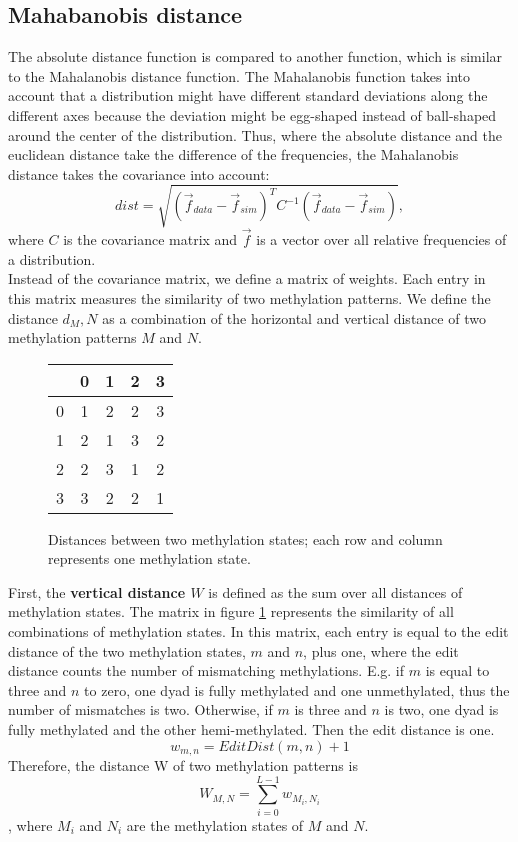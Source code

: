 \subsection{Mahabanobis distance}
\label{Mahalanobis}
The absolute distance function is compared to another function, which is similar to the Mahalanobis distance function. The Mahalanobis function takes into account that a distribution might have different standard deviations along the different axes because the deviation might be egg-shaped instead of ball-shaped around the center of the distribution. Thus, where the absolute distance and the euclidean distance take the difference of the frequencies, the Mahalanobis distance takes the covariance into account:
\[dist = \sqrt{(\vec{f}_{data}-\vec{f}_{sim})^T C^{-1} (\vec{f}_{data}-\vec{f}_{sim})},\]
where $C$ is the covariance matrix and $\vec{f}$ is a vector over all relative frequencies of a distribution.\\

Instead of the covariance matrix, we define a matrix of weights. Each entry in this matrix measures the similarity of two methylation patterns. We define the distance $d_M,N$ as a combination of the horizontal and vertical distance of two methylation patterns $M$ and $N$.\\

\begin{figure}[h]
\centering
\begin{tabularx}{\textwidth}{l|c|c|c|c}
&	0&	1&	2&	3\\
\hline
0&	1&	2&	2&	3\\
1&	2&	1&	3&	2\\
2&	2&	3&	1&	2\\
3&	3&	2&	2&	1
\end{tabularx}
\label{w}
\caption{Distances between two methylation states; each row and column represents one methylation state.}
\end{figure}
First, the \textbf{vertical distance $W$} is defined as the sum over all distances of methylation states. The matrix in figure \ref{w} represents the similarity of all combinations of methylation states. In this matrix, each entry is equal to the edit distance of the two methylation states, $m$ and $n$, plus one, where the edit distance counts the number of mismatching methylations. E.g. if $m$ is equal to three and $n$ to zero, one dyad is fully methylated and one unmethylated, thus the number of mismatches is two. Otherwise, if $m$ is three and $n$ is two, one dyad is fully methylated and the other hemi-methylated. Then the edit distance is one.
\[w_{m,n} = EditDist(m,n)+1\]
Therefore, the distance W of two methylation patterns is
\[W_{M,N} = \sum^{L-1}_{i=0}{w_{M_i,N_i}}\],
where $M_i$ and $N_i$ are the methylation states of $M$ and $N$.\\


